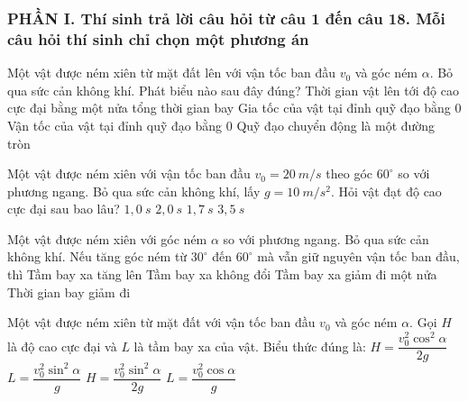 \subsubsection*{PHẦN I. Thí sinh trả lời câu hỏi từ câu 1 đến câu 18. Mỗi câu hỏi thí sinh chỉ chọn một phương án}
\setcounter{ex}{0}

\begin{ex}
Một vật được ném xiên từ mặt đất lên với vận tốc ban đầu $v_0$ và góc ném $\alpha$. Bỏ qua sức cản không khí. Phát biểu nào sau đây đúng?
\choice
{\True Thời gian vật lên tới độ cao cực đại bằng một nửa tổng thời gian bay}
{Gia tốc của vật tại đỉnh quỹ đạo bằng $0$}
{Vận tốc của vật tại đỉnh quỹ đạo bằng $0$}
{Quỹ đạo chuyển động là một đường tròn}
 \end{ex}

\begin{ex}
Một vật được ném xiên với vận tốc ban đầu $v_0 = 20\ m/s$ theo góc $60^\circ$ so với phương ngang. Bỏ qua sức cản không khí, lấy $g = 10\ m/s^2$. Hỏi vật đạt độ cao cực đại sau bao lâu?
\choice
{$1,0\ s$}
{$2,0\ s$}
{\True $1,7\ s$}
{$3,5\ s$}
 \end{ex}

\begin{ex}
Một vật được ném xiên với góc ném $\alpha$ so với phương ngang. Bỏ qua sức cản không khí. Nếu tăng góc ném từ $30^\circ$ đến $60^\circ$ mà vẫn giữ nguyên vận tốc ban đầu, thì
\choice
{Tầm bay xa tăng lên}
{\True Tầm bay xa không đổi}
{Tầm bay xa giảm đi một nửa}
{Thời gian bay giảm đi}
 \end{ex}

\begin{ex}
Một vật được ném xiên từ mặt đất với vận tốc ban đầu $v_0$ và góc ném $\alpha$. Gọi $H$ là độ cao cực đại và $L$ là tầm bay xa của vật. Biểu thức đúng là:
\choice
{$H = \dfrac{v_0^2 \cos^2 \alpha}{2g}$}
{$L = \dfrac{v_0^2 \sin^2 \alpha}{g}$}
{\True $H = \dfrac{v_0^2 \sin^2 \alpha}{2g}$}
{$L = \dfrac{v_0^2 \cos \alpha}{g}$}
 \end{ex}


